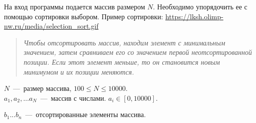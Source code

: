 На вход программы подается массив размером $N$. Необходимо упорядочить ее с помощью сортировки выбором.
Пример сортировки: \url{https://lksh.olimp-nw.ru/media/selection_sort.gif}

\begin{quote}
\textit{Чтобы отсортировать массив, находим элемент с минимальным значением, затем сравниваем его со значением первой неотсортированной позиции. 
Если этот элемент меньше, то он становится новым минимумом и их позиции меняются.}
\end{quote}

\InputFile

\noindent
$N$~---~размер массива, $100 \leq N \leq 10000$. \\
$a_1, a_2, \ldots a_N$~---~массив с числами. $ a_i \in [0, 10000]$. 

\OutputFile

\noindent
$b_1 ... b_n$~---~отсортированные элементы массива.

\SAMPLES
